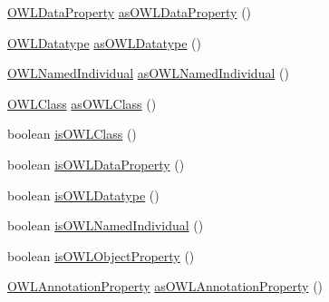 \begin{DoxyCompactItemize}
\item 
\hyperlink{interfaceorg_1_1semanticweb_1_1owlapi_1_1model_1_1_o_w_l_data_property}{O\-W\-L\-Data\-Property} \hyperlink{classuk_1_1ac_1_1manchester_1_1cs_1_1owl_1_1owlapi_1_1_o_w_l_object_property_impl_ae87bdb9e7f3bf3aa462932903e5038d2}{as\-O\-W\-L\-Data\-Property} ()
\item 
\hyperlink{interfaceorg_1_1semanticweb_1_1owlapi_1_1model_1_1_o_w_l_datatype}{O\-W\-L\-Datatype} \hyperlink{classuk_1_1ac_1_1manchester_1_1cs_1_1owl_1_1owlapi_1_1_o_w_l_object_property_impl_adff544d0832e2b25647b7f24696023ea}{as\-O\-W\-L\-Datatype} ()
\item 
\hyperlink{interfaceorg_1_1semanticweb_1_1owlapi_1_1model_1_1_o_w_l_named_individual}{O\-W\-L\-Named\-Individual} \hyperlink{classuk_1_1ac_1_1manchester_1_1cs_1_1owl_1_1owlapi_1_1_o_w_l_object_property_impl_a09076573d6cc3301f9634a239a579eaf}{as\-O\-W\-L\-Named\-Individual} ()
\item 
\hyperlink{interfaceorg_1_1semanticweb_1_1owlapi_1_1model_1_1_o_w_l_class}{O\-W\-L\-Class} \hyperlink{classuk_1_1ac_1_1manchester_1_1cs_1_1owl_1_1owlapi_1_1_o_w_l_object_property_impl_a088aa7b9a39fde30194fa856addeff97}{as\-O\-W\-L\-Class} ()
\item 
boolean \hyperlink{classuk_1_1ac_1_1manchester_1_1cs_1_1owl_1_1owlapi_1_1_o_w_l_object_property_impl_a3f719316ec94161cea7a6e44a58317b3}{is\-O\-W\-L\-Class} ()
\item 
boolean \hyperlink{classuk_1_1ac_1_1manchester_1_1cs_1_1owl_1_1owlapi_1_1_o_w_l_object_property_impl_a02a75890fdf1c8872fc91775be5bcbe8}{is\-O\-W\-L\-Data\-Property} ()
\item 
boolean \hyperlink{classuk_1_1ac_1_1manchester_1_1cs_1_1owl_1_1owlapi_1_1_o_w_l_object_property_impl_ab381ad20d5f4820c6f2e0ec8eaff9cd8}{is\-O\-W\-L\-Datatype} ()
\item 
boolean \hyperlink{classuk_1_1ac_1_1manchester_1_1cs_1_1owl_1_1owlapi_1_1_o_w_l_object_property_impl_ae8985018d55150884965baa9fa35eaa9}{is\-O\-W\-L\-Named\-Individual} ()
\item 
boolean \hyperlink{classuk_1_1ac_1_1manchester_1_1cs_1_1owl_1_1owlapi_1_1_o_w_l_object_property_impl_a43689e9070dfe8b9f222c8a1d5a8e2c3}{is\-O\-W\-L\-Object\-Property} ()
\item 
\hyperlink{interfaceorg_1_1semanticweb_1_1owlapi_1_1model_1_1_o_w_l_annotation_property}{O\-W\-L\-Annotation\-Property} \hyperlink{classuk_1_1ac_1_1manchester_1_1cs_1_1owl_1_1owlapi_1_1_o_w_l_object_property_impl_aa29cf0af483f667632d50a74afe02d45}{as\-O\-W\-L\-Annotation\-Property} ()

\end{DoxyCompactItemize}
